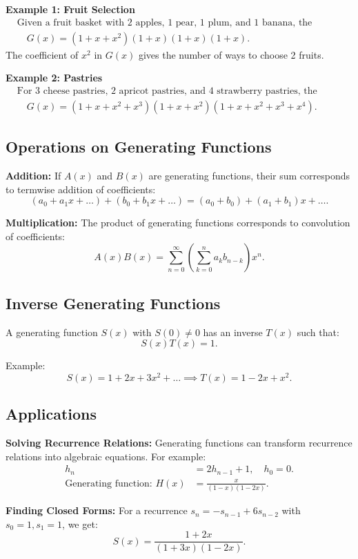 \textbf{Example 1: Fruit Selection}
\begin{align*}
    &\text{Given a fruit basket with 2 apples, 1 pear, 1 plum, and 1 banana, the generating function is:} \\
    &\quad G(x) = (1+x+x^2)(1+x)(1+x)(1+x).
\end{align*}
The coefficient of $x^2$ in $G(x)$ gives the number of ways to choose 2 fruits.

\textbf{Example 2: Pastries}
\begin{align*}
    &\text{For 3 cheese pastries, 2 apricot pastries, and 4 strawberry pastries, the generating function is:} \\
    &\quad G(x) = (1+x+x^2+x^3)(1+x+x^2)(1+x+x^2+x^3+x^4).
\end{align*}

\subsection*{Operations on Generating Functions}

\textbf{Addition:} If $A(x)$ and $B(x)$ are generating functions, their sum corresponds to termwise addition of coefficients:
\[ (a_0 + a_1x + \dots) + (b_0 + b_1x + \dots) = (a_0 + b_0) + (a_1 + b_1)x + \dots. \]

\textbf{Multiplication:} The product of generating functions corresponds to convolution of coefficients:
\[ A(x)B(x) = \sum_{n=0}^\infty \left( \sum_{k=0}^n a_k b_{n-k} \right)x^n. \]

\subsection*{Inverse Generating Functions}

A generating function $S(x)$ with $S(0) \neq 0$ has an inverse $T(x)$ such that:
\[ S(x)T(x) = 1. \]

Example:
\[ S(x) = 1+2x+3x^2+\dots \implies T(x) = 1-2x+x^2. \]

\subsection*{Applications}

\textbf{Solving Recurrence Relations:}
Generating functions can transform recurrence relations into algebraic equations. For example:
\begin{align*}
    h_n &= 2h_{n-1} + 1, \quad h_0 = 0. \\
    \text{Generating function: } H(x) &= \frac{x}{(1-x)(1-2x)}.
\end{align*}

\textbf{Finding Closed Forms:}
For a recurrence $s_n = -s_{n-1} + 6s_{n-2}$ with $s_0 = 1, s_1 = 1$, we get:
\[ S(x) = \frac{1+2x}{(1+3x)(1-2x)}. \]